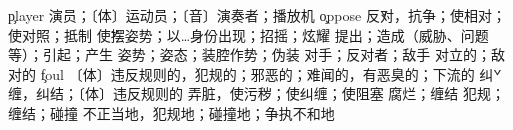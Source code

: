 \begin{multicols}{2}
\c{player}  \n 演员；〔体〕运动员；〔音〕演奏者；播放机
\c{oppose}  \v 反对，抗争；使相对；使对照；抵制
  \v 使摆姿势；以…身份出现；招摇；炫耀 \vt 提出；造成（威胁、问题等）；引起；产生 \n 姿势；姿态；装腔作势；伪装
  \n 对手；反对者；敌手 \a 对立的；敌对的
\c{foul}  \a 〔体〕违反规则的，犯规的；邪恶的；难闻的，有恶臭的；下流的 \v 纠缠，纠结；〔体〕违反规则的 \vt 弄脏，使污秽；使纠缠；使阻塞 \vi 腐烂；缠结 \n 犯规；缠结；碰撞 \ad 不正当地，犯规地；碰撞地；争执不和地


\end{multicols}
